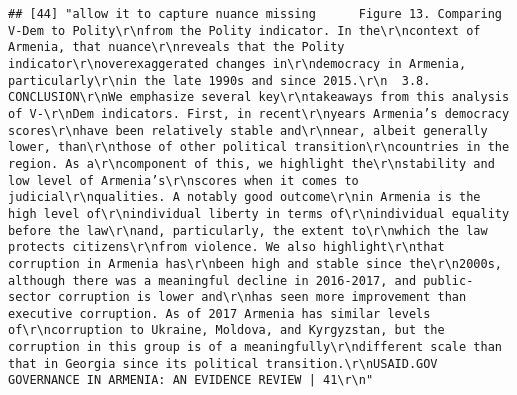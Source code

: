 \documentclass[
]{article}
\begin{document}
\begin{verbatim}
## [44] "allow it to capture nuance missing      Figure 13. Comparing V-Dem to Polity\r\nfrom the Polity indicator. In the\r\ncontext of Armenia, that nuance\r\nreveals that the Polity indicator\r\noverexaggerated changes in\r\ndemocracy in Armenia, particularly\r\nin the late 1990s and since 2015.\r\n  3.8.      CONCLUSION\r\nWe emphasize several key\r\ntakeaways from this analysis of V-\r\nDem indicators. First, in recent\r\nyears Armenia’s democracy scores\r\nhave been relatively stable and\r\nnear, albeit generally lower, than\r\nthose of other political transition\r\ncountries in the region. As a\r\ncomponent of this, we highlight the\r\nstability and low level of Armenia’s\r\nscores when it comes to judicial\r\nqualities. A notably good outcome\r\nin Armenia is the high level of\r\nindividual liberty in terms of\r\nindividual equality before the law\r\nand, particularly, the extent to\r\nwhich the law protects citizens\r\nfrom violence. We also highlight\r\nthat corruption in Armenia has\r\nbeen high and stable since the\r\n2000s, although there was a meaningful decline in 2016-2017, and public-sector corruption is lower and\r\nhas seen more improvement than executive corruption. As of 2017 Armenia has similar levels of\r\ncorruption to Ukraine, Moldova, and Kyrgyzstan, but the corruption in this group is of a meaningfully\r\ndifferent scale than that in Georgia since its political transition.\r\nUSAID.GOV                                                   GOVERNANCE IN ARMENIA: AN EVIDENCE REVIEW | 41\r\n"                                                                                                                                                                                                                                                                                                                                                                                                                                                                                                                                                                                                                                                                                                                                                                                                                                                                                                                                                                                                                                                                                                                                                                                                                                                                                                                                                                                                                                                                                                                                                                                                                                                                                                                                                                                                                                                      
\end{verbatim}
\end{document}
